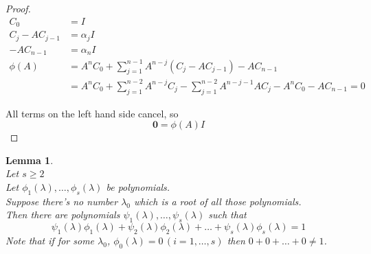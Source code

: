 \documentclass[twoside]{amsart}
\theoremstyle{plain}
\newtheorem{lemma}{Lemma}
\theoremstyle{definition}
\begin{document}
\begin{proof}
\footnotesize{
  \[
  \begin{aligned}
    C_0 & = I \\
    C_j - AC_{j-1} &= \alpha_j I \\
    -AC_{n-1} & = \alpha_n I \\
    \phi(A) & = A^n C_0 + \sum_{j=1}^{n-1} A^{n-j} (C_j - AC_{j-1} ) -AC_{n-1} \\
    & =  A^n C_0 + \sum_{j=1}^{n-2} A^{n-j}C_j - \sum_{j=1}^{n-2} A^{n-j-1}AC_j - A^n C_0 - AC_{n-1} = 0  
  \end{aligned}
  \]
 }
\normalsize

All terms on the left hand side cancel, so 
\[
\mathbf{0} = \phi(A) I
\]
\end{proof}

\begin{lemma}\label{L:Principal_Vector_Lemma_2_Rootless_Polynomials} \quad \\
  Let $s \geq 2$ \\ 
  Let $\phi_1(\lambda) , \dots , \phi_s(\lambda)$ be polynomials. \\
  Suppose there's no number $\lambda_0$ which is a root of all those polynomials.  \\ 
  \phantom{Sup} Then there are polynomials $\psi_1(\lambda), \dots, \psi_s(\lambda)$ such that 
  \begin{equation*}
    \psi_1(\lambda) \phi_1(\lambda) + \psi_2(\lambda) \phi_2(\lambda) + \dots + \psi_s(\lambda) \phi_s(\lambda) = 1
  \end{equation*}
Note that if for some $\lambda_0$, $\phi_0(\lambda) = 0 \, (i=1,\dots, s)$ then $0+ 0 + \dots + 0 \neq 1$.  
\end{lemma}
\end{document}
